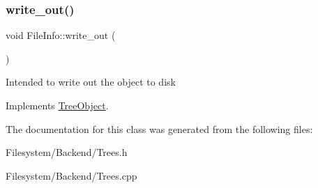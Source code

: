 \subsubsection{\texorpdfstring{write\+\_\+out()}{write\_out()}}
{\footnotesize\ttfamily void File\+Info\+::write\+\_\+out (\begin{DoxyParamCaption}{ }\end{DoxyParamCaption})\hspace{0.3cm}{\ttfamily [virtual]}}

Intended to write out the object to disk 

Implements \mbox{\hyperlink{classTreeObject_a63708d61353d83e3e03597394bb7aca0}{Tree\+Object}}.



The documentation for this class was generated from the following files\+:\begin{DoxyCompactItemize}
\item 
Filesystem/\+Backend/Trees.\+h\item 
Filesystem/\+Backend/Trees.\+cpp\end{DoxyCompactItemize}
